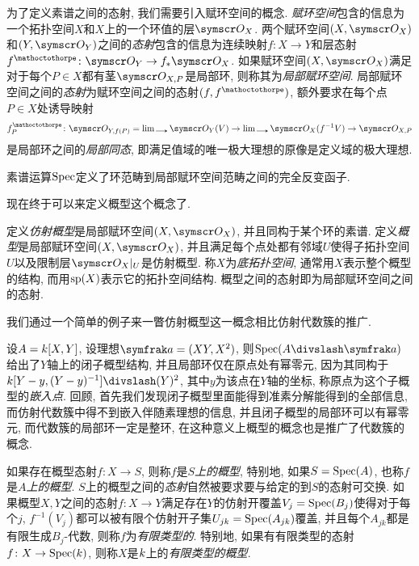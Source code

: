 为了定义素谱之间的态射, 我们需要引入赋环空间的概念. \emph{赋环空间}包含的信息为一个拓扑空间$X$和$X$上的一个环值的层$\OO_X$. 两个赋环空间$(X, \OO_X)$和$(Y, \OO_Y)$之间的\emph{态射}包含的信息为连续映射$f\colon X\to Y$和层态射$f^\mathoctothorpe\colon \OO_Y\to f_*\OO_X$. 如果赋环空间$(X, \OO_X)$满足对于每个$P\in X$都有茎$\OO_{X, P}$是局部环, 则称其为\emph{局部赋环空间}. 局部赋环空间之间的\emph{态射}为赋环空间之间的态射$(f, f^\mathoctothorpe)$, 额外要求在每个点$P\in X$处诱导映射
\begin{equation*}
  f^\mathoctothorpe_P\colon \OO_{Y, f(P)}=\dlim \OO_Y(V)\to \dlim\OO_X (f^{-1}V) \to \OO_{X, P}
\end{equation*}
是局部环之间的\emph{局部同态}, 即满足值域的唯一极大理想的原像是定义域的极大理想.

\begin{propositionnoproof}
  素谱运算$\Spec$定义了环范畴到局部赋环空间范畴之间的完全反变函子.
\end{propositionnoproof}

现在终于可以来定义概型这个概念了.

\begin{definition}
  定义\emph{仿射概型}是局部赋环空间$(X, \OO_X)$, 并且同构于某个环的素谱. 定义\emph{概型}是局部赋环空间$(X, \OO_X)$, 并且满足每个点处都有邻域$U$使得子拓扑空间$U$以及限制层$\OO_X\restrict{U}$是仿射概型. 称$X$为\emph{底拓扑空间}, 通常用$X$表示整个概型的结构, 而用$\sp (X)$表示它的拓扑空间结构. 概型之间的态射即为局部赋环空间之间的态射.
\end{definition}

我们通过一个简单的例子来一瞥仿射概型这一概念相比仿射代数簇的推广.

\begin{example}
  设$A=\kk [X, Y]$, 设理想$\ideal{a}=(XY, X^2)$, 则$\Spec (A{\divslash}\ideal{a})$给出了$Y$轴上的闭子概型结构, 并且局部环仅在原点处有幂零元, 因为其同构于$\kk [Y-y, (Y-y)^{-1}]{\divslash}(Y)^2$, 其中$y$为该点在$Y$轴的坐标, 称原点为这个子概型的\emph{嵌入点}. 回顾, 首先我们发现闭子概型里面能得到准素分解能得到的全部信息, 而仿射代数簇中得不到嵌入伴随素理想的信息, 并且闭子概型的局部环可以有幂零元, 而代数簇的局部环一定是整环, 在这种意义上概型的概念也是推广了代数簇的概念.
\end{example}

如果存在概型态射$f\colon X\to S$, 则称$f$是$S$\emph{上的概型}, 特别地, 如果$S=\Spec (A)$, 也称$f$是$A$\emph{上的概型}. $S$上的概型之间的\emph{态射}自然被要求要与给定的到$S$的态射可交换. 如果概型$X, Y$之间的态射$f\colon X\to Y$满足存在$Y$的仿射开覆盖$V_j=\Spec (B_j)$使得对于每个$j$, $f^{-1}(V_j)$都可以被有限个仿射开子集$U_{jk}=\Spec (A_{jk})$覆盖, 并且每个$A_{jk}$都是有限生成$B_j$-代数, 则称$f$为\emph{有限类型的}. 特别地, 如果有有限类型的态射$f\colon X\to \Spec (\kk)$, 则称$X$是$\kk$上的\emph{有限类型的概型}.

